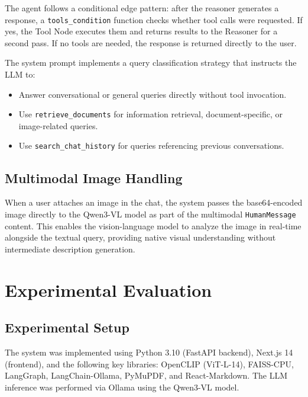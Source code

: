 \documentclass[conference]{IEEEtran}
\begin{document}
The agent follows a conditional edge pattern: after the reasoner generates a response, a \texttt{tools\_condition} function checks whether tool calls were requested. If yes, the Tool Node executes them and returns results to the Reasoner for a second pass. If no tools are needed, the response is returned directly to the user.

The system prompt implements a query classification strategy that instructs the LLM to:
\begin{itemize}
    \item Answer conversational or general queries directly without tool invocation.
    \item Use \texttt{retrieve\_documents} for information retrieval, document-specific, or image-related queries.
    \item Use \texttt{search\_chat\_history} for queries referencing previous conversations.
\end{itemize}

\subsection{Multimodal Image Handling}

When a user attaches an image in the chat, the system passes the base64-encoded image directly to the Qwen3-VL model as part of the multimodal \texttt{HumanMessage} content. This enables the vision-language model to analyze the image in real-time alongside the textual query, providing native visual understanding without intermediate description generation.

\section{Experimental Evaluation}

\subsection{Experimental Setup}

The system was implemented using Python 3.10 (FastAPI backend), Next.js 14 (frontend), and the following key libraries: OpenCLIP (ViT-L-14), FAISS-CPU, LangGraph, LangChain-Ollama, PyMuPDF, and React-Markdown. The LLM inference was performed via Ollama using the Qwen3-VL model.
\end{document}

